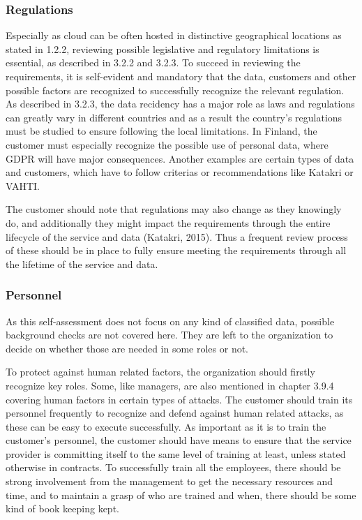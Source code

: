 \documentclass{article}
\begin{document}
\subsubsection{Regulations}
Especially as cloud can be often hosted in distinctive geographical locations as stated in 1.2.2, reviewing possible legislative and regulatory limitations is essential, as described in 3.2.2 and 3.2.3. To succeed in reviewing the requirements, it is self-evident and mandatory that the data, customers and other possible factors are recognized to successfully recognize the relevant regulation. As described in 3.2.3, the data recidency has a major role as laws and regulations can greatly vary in different countries and as a result the country's regulations must be studied to ensure following the local limitations. In Finland, the customer must especially recognize the possible use of personal data, where GDPR will have major consequences. Another examples are certain types of data and customers, which have to follow criterias or recommendations like Katakri or VAHTI.
\par
The customer should note that regulations may also change as they knowingly do, and additionally they might impact the requirements through the entire lifecycle of the service and data (Katakri, 2015). Thus a frequent review process of these should be in place to fully ensure meeting the requirements through all the lifetime of the service and data.

\subsubsection{Personnel}
As this self-assessment does not focus on any kind of classified data, possible background checks are not covered here. They are left to the organization to decide on whether those are needed in some roles or not.
\par
To protect against human related factors, the organization should firstly recognize key roles. Some, like managers, are also mentioned in chapter 3.9.4 covering human factors in certain types of attacks. The customer should train its personnel frequently to recognize and defend against human related attacks, as these can be easy to execute successfully. As important as it is to train the customer's personnel, the customer should have means to ensure that the service provider is committing itself to the same level of training at least, unless stated otherwise in contracts. To successfully train all the employees, there should be strong involvement from the management to get the necessary resources and time, and to maintain a grasp of who are trained and when, there should be some kind of book keeping kept.
\end{document}
